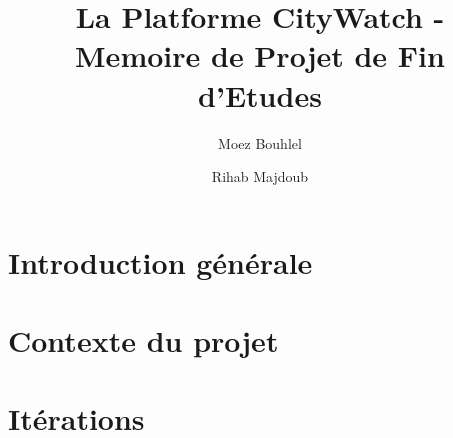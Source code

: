 \documentclass[
a4paper,
12pt,
onecolumn,
titlepage,
final,
]{article} %
\title{La Platforme CityWatch - Memoire de Projet de Fin d'Etudes}
\author{Moez Bouhlel}
\author{Rihab Majdoub}
\affil{Faculté des Sciences de Sfax, Tunisie}
\renewcommand{\baselinestretch}{1.2}\normalsize
\begin{document}


\pagestyle{empty}




\clearpage

\clearpage
{}
\pagestyle{plain}

\setlength{\parskip}{0pt}
\hypersetup{linkcolor=black}
\setcounter{tocdepth}{3}

\tableofcontents

\clearpage
\listoffigures

\clearpage
\listoftables





\cleardoublepage
\setlength{\parskip}{8pt}
\renewcommand{\baselinestretch}{1.4}\normalsize
\fancyhf{}
\rhead{\rightmark}
\rfoot{\thepage}
\renewcommand{\headrulewidth}{1pt}
\pagestyle{fancy}
\renewcommand{\sectionmark}[1]{\markright{\thesection\ \ --\ \ #1}}

\part{Introduction générale}

\clearpage
\part{Contexte du projet}

\clearpage
\part{Itérations}

\clearpage

\clearpage

\clearpage



\clearpage
\renewcommand{\sectionmark}[1]{\markright{\thesection\ \ --\ \ #1}}
\begin{appendices}

\end{appendices}
\end{document}
